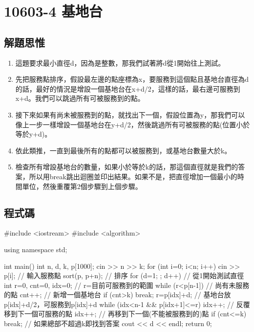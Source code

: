 \section{10603-4 基地台}

\subsection{解題思惟}
\begin{enumerate}
	\item 這題要求最小直徑d，因為是整數，那我們試著將d從1開始往上測試。
	\item 先把服務點排序，假設最左邊的點座標為x，要服務到這個點且基地台直徑為d的話，最好的情況是增設一個基地台在x+d/2，這樣的話，最右邊可服務到x+d。我們可以跳過所有可被服務到的點。
	\item 接下來如果有尚未被服務到的點，就找出下一個，假設位置為y，那我們可以像上一步一樣增設一個基地台在y+d/2，然後跳過所有可被服務的點(位置小於等於y+d)。
	\item 依此類推，一直到最後所有的點都可以被服務到，或基地台數量大於k。
	\item 檢查所有增設基地台的數量，如果小於等於k的話，那這個直徑就是我們的答案，所以用break跳出迴圈並印出結果。如果不是，把直徑增加一個最小的時間單位，然後重覆第2個步驟到上個步驟。
\end{enumerate}

\subsection{程式碼}
\begin{cppcode}
#include <iostream>
#include <algorithm>

using namespace std;

int main()
{
	int n, d, k, p[1000];
	cin >> n >> k;
	for (int i=0; i<n; i++) cin >> p[i]; // 輸入服務點
	sort(p, p+n); // 排序
	for (d=1; ; d++) { // 從1開始測試直徑
		int r=0, cnt=0, idx=0; // r=目前可服務到的範圍
		while (r<p[n-1]) { // 尚有未服務的點
			cnt++; // 新增一個基地台
			if (cnt>k) break;
			r=p[idx]+d; // 基地台放p[idx]+d/2，可服務到p[idx]+d
			while (idx<n-1 && p[idx+1]<=r) idx++; // 反覆移到下一個可服務的點
			idx++; // 再移到下一個(不能被服務到的)點
		}
		if (cnt<=k) break; // 如果總部不超過k即找到答案
	}
	cout << d << endl;
	return 0;
}
\end{cppcode}
